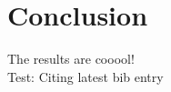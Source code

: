 \documentclass[fleqn, leqno]{article}
\begin{document}
\section*{Conclusion}

The results are cooool!\\

Test: Citing latest bib entry\cite{GandS}\\



\end{document}
